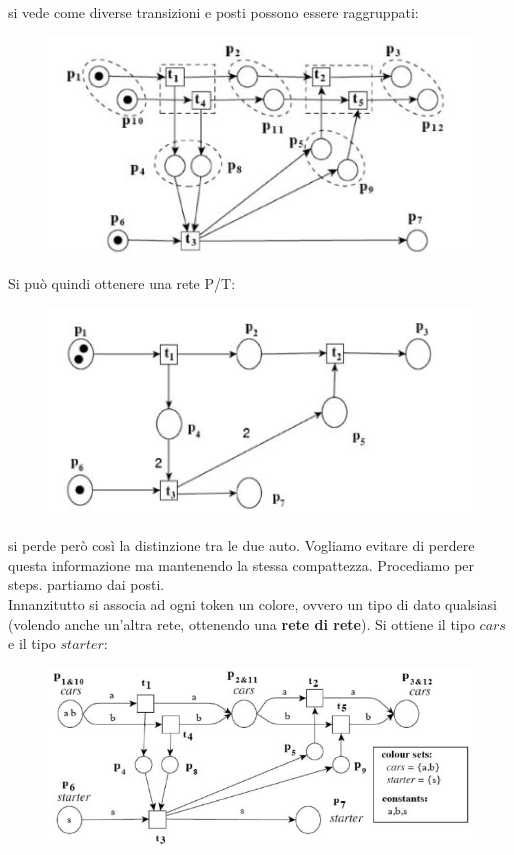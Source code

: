 \documentclass[a4paper,12pt, oneside]{book}
\begin{document}
\begin{esempio}
\begin{figure}[H]
  \end{figure}
  si vede come diverse transizioni e posti possono essere raggruppati:
  \begin{figure}[H]
    \centering
    \includegraphics[scale = 0.7]{img/c3.jpg}
  \end{figure}
  Si può quindi ottenere una rete P/T:
  \begin{figure}[H]
    \centering
    \includegraphics[scale = 0.7]{img/c5.jpg}
  \end{figure}
  si perde però così la distinzione tra le due auto. Vogliamo evitare di perdere
  questa informazione ma mantenendo la stessa compattezza. Procediamo per
  steps.
  \newpage
  partiamo dai posti.\\
  Innanzitutto si associa ad ogni token un colore, ovvero un tipo di dato
  qualsiasi (volendo anche un'altra rete, ottenendo una \textbf{rete di
    rete}). Si ottiene il tipo $cars$ e il tipo $starter$:
  \begin{figure}[H]
    \centering
    \includegraphics[scale = 0.6]{img/c7.jpg}

\end{figure}
\end{esempio}
\end{document}

